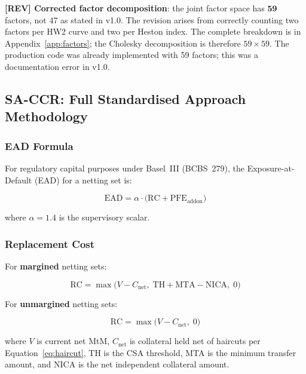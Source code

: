 \documentclass[11pt,a4paper]{article}
\begin{document}
\textbf{[REV] Corrected factor decomposition}: the joint factor space has
$\mathbf{59}$ factors, not 47 as stated in v1.0. The revision arises from
correctly counting two factors per HW2 curve and two per Heston index.
The complete breakdown is in Appendix~\ref{app:factors}; the Cholesky
decomposition is therefore $59 \times 59$. The production code was already
implemented with 59 factors; this was a documentation error in v1.0.

\subsection{SA-CCR: Full Standardised Approach Methodology}
\label{sec:sa_ccr_full}

\subsubsection{EAD Formula}

For regulatory capital purposes under Basel~III (BCBS~279), the
Exposure-at-Default (EAD) for a netting set is:

\begin{equation}
  \text{EAD} = \alpha \cdot \bigl(\text{RC} + \text{PFE}_{\text{addon}}\bigr)
  \label{eq:sa_ccr_ead}
\end{equation}

where $\alpha = 1.4$ is the supervisory scalar.

\subsubsection{Replacement Cost}

For \textbf{margined} netting sets:

\begin{equation}
  \text{RC} = \max\!\bigl(V - C_{\text{net}},\; \text{TH} + \text{MTA} - \text{NICA},\; 0\bigr)
  \label{eq:rc_margined}
\end{equation}

For \textbf{unmargined} netting sets:

\begin{equation}
  \text{RC} = \max\!\bigl(V - C_{\text{net}},\; 0\bigr)
  \label{eq:rc_unmargined}
\end{equation}

where $V$ is current net MtM, $C_{\text{net}}$ is collateral held net of
haircuts per Equation~\eqref{eq:haircut}, TH is the CSA threshold, MTA is the
minimum transfer amount, and NICA is the net independent collateral amount.
\end{document}
